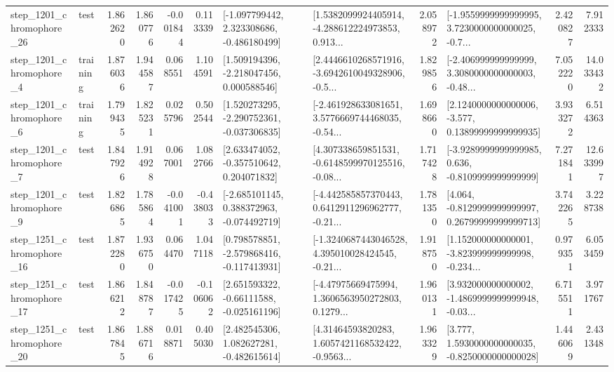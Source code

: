 \begin{tabular}{llrrrrllrlrr}
 step\_1201\_chromophore\_26 &      test &      1.862620 &    1.860776 &     -0.001844 &  0.113339 &   [-1.097799442, 2.323308686, -0.486180499] &  [1.5382099924405914, -4.288612224973853, 0.913... &       2.058972 &  [-1.9559999999999995, 3.7230000000000025, -0.7... &            2.420827 &          7.912333 \\
  step\_1201\_chromophore\_4 &  training &      1.876036 &    1.944587 &      0.068551 &  1.104591 &    [1.509194396, -2.218047456, 0.000588546] &  [2.4446610268571916, -3.6942610049328906, -0.5... &       1.829856 &  [-2.406999999999999, 3.3080000000000003, -0.48... &            7.052220 &         14.033432 \\
  step\_1201\_chromophore\_6 &  training &      1.799435 &    1.825231 &      0.025796 &  0.502544 &   [1.520273295, -2.290752361, -0.037306835] &  [-2.461928633081651, 3.5776669744468035, -0.54... &       1.698660 &  [2.1240000000000006, -3.577, 0.13899999999999935] &            3.933272 &          6.514363 \\
  step\_1201\_chromophore\_7 &      test &      1.847926 &    1.914928 &      0.067001 &  1.082766 &    [2.633474052, -0.357510642, 0.204071832] &  [4.307338659851531, -0.6148599970125516, -0.08... &       1.717428 &  [-3.9289999999999985, 0.636, -0.8109999999999999] &            7.271841 &         12.633997 \\
  step\_1201\_chromophore\_9 &      test &      1.826865 &    1.785864 &     -0.041001 & -0.438033 &   [-2.685101145, 0.388372963, -0.074492719] &  [-4.442585857370443, 0.6412911296962777, -0.21... &       1.781350 &  [4.064, -0.8129999999999997, 0.26799999999999713] &            3.742265 &          3.228738 \\
 step\_1251\_chromophore\_16 &      test &      1.872280 &    1.936750 &      0.064470 &  1.047118 &   [0.798578851, -2.579868416, -0.117413931] &  [-1.3240687443046528, 4.395010028424545, -0.21... &       1.918750 &  [1.152000000000001, -3.823999999999998, -0.234... &            0.979351 &          6.053459 \\
 step\_1251\_chromophore\_17 &      test &      1.866212 &    1.848787 &     -0.017425 & -0.106062 &    [2.651593322, -0.66111588, -0.025161196] &  [-4.47975669475994, 1.3606563950272803, 0.1279... &       1.960131 &  [3.932000000000002, -1.4869999999999948, -0.03... &            6.715511 &          3.971767 \\
 step\_1251\_chromophore\_20 &      test &      1.867845 &    1.886716 &      0.018871 &  0.405030 &    [2.482545306, 1.082627281, -0.482615614] &  [4.31464593820283, 1.6057421168532422, -0.9563... &       1.963329 &   [3.777, 1.5930000000000035, -0.8250000000000028] &            1.446069 &          2.431348 \\

\end{tabular}

